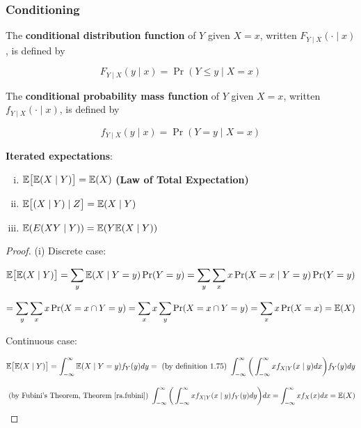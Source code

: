 \subsubsection{Conditioning}

\begin{definition}The \textbf{conditional distribution function} of \(Y\) given \(X = x\), written \(F_{Y\mid X}( \cdot \mid x)\), is defined by

\[
F_{Y\mid X}( y \mid x) = \Pr(Y \leq y \mid X = x)
\]
\end{definition}

\begin{definition}The \textbf{conditional probability mass function} of \(Y\) given \(X = x\), written \(f_{Y\mid X}( \cdot \mid x)\), is defined by

\[
f_{Y\mid X}( y \mid x) = \Pr(Y = y \mid X = x)
\]
\end{definition}

\begin{theorem}\textbf{Iterated expectations}: 

\begin{enumerate}[(i)]

\item \(\E\big[ \E(X \mid Y) \big] = \E(X)\) \textbf{(Law of Total Expectation)}

\item \(\E \big[ (X \mid Y) \mid Z \big] = \E(X \mid Y)\)

\item \( \E(E(XY \mid Y)) = \E(Y \E(X \mid Y))\)

\end{enumerate}
\end{theorem}

\begin{proof}(i) Discrete case:

\[
\E\big[ \E(X \mid Y) \big] = \sum_{y} \E(X \mid Y = y) \Pr(Y=y) =  \sum_{y} \sum_{x} x \Pr(X=x \mid Y=y) \Pr(Y=y) 
\]

\[
=  \sum_{y} \sum_{x} x \Pr(X=x \cap Y=y) =  \sum_{x}x \sum_{y}  \Pr(X=x \cap Y=y) = \sum_x x \Pr(X=x) = \E(X)
\]

Continuous case:

\[
\E\big[ \E(X \mid Y) \big]  = \int_{-\infty}^\infty \E(X \mid Y = y) f_Y(y) dy = \text{ (by definition 1.75) }  \int_{-\infty}^\infty \bigg( \int_{-\infty}^\infty x f_{X\mid Y}(x \mid y) dx \bigg)  f_Y(y) dy
\]

\[
\text{ (by Fubini's Theorem, Theorem \ref{ra.fubini}) }  \int_{-\infty}^\infty \bigg( \int_{-\infty}^\infty x f_{X\mid Y}(x \mid y)  f_Y(y) dy \bigg)  dx = \int_{-\infty}^\infty x f_X(x) dx = \E(X)
\]

\end{proof}

